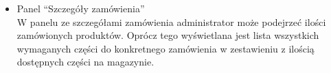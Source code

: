 \documentclass{article}
\begin{document}
\begin{itemize}
   \item Panel ``Szczegóły zamówienia''\\
   \newline
   W panelu ze szczegółami zamówienia administrator może podejrzeć ilości zamówionych produktów.
   Oprócz tego wyświetlana jest lista wszystkich wymaganych części do konkretnego zamówienia w
   zestawieniu z ilością dostępnych części na magazynie.
\end{itemize}
\end{document}
